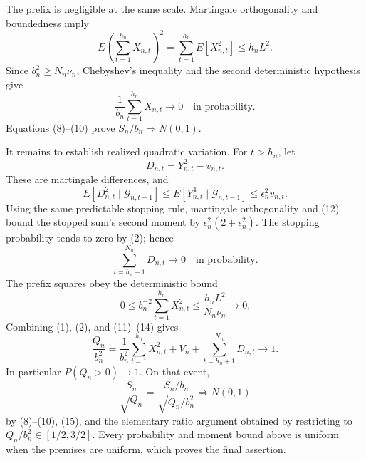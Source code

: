 The prefix is negligible at the same scale. Martingale orthogonality and boundedness imply
\[
 E\left(\sum_{t=1}^{h_n}X_{n,t}\right)^2
 =\sum_{t=1}^{h_n}E[X_{n,t}^2]\le h_nL^2.
\tag{9}
\]
Since \(b_n^2\ge N_n\nu_n\), Chebyshev's inequality and the second deterministic hypothesis give
\[
 \frac{1}{b_n}\sum_{t=1}^{h_n}X_{n,t}\longrightarrow0
 \quad\text{in probability}.
\tag{10}
\]
Equations (8)--(10) prove \(S_n/b_n\Rightarrow N(0,1)\).

It remains to establish realized quadratic variation. For \(t>h_n\), let
\[
 D_{n,t}=Y_{n,t}^2-v_{n,t}.
\tag{11}
\]
These are martingale differences, and
\[
 E[D_{n,t}^2\mid\mathcal G_{n,t-1}]
 \le E[Y_{n,t}^4\mid\mathcal G_{n,t-1}]
 \le\epsilon_n^2v_{n,t}.
\tag{12}
\]
Using the same predictable stopping rule, martingale orthogonality and (12) bound the stopped sum's second moment by \(\epsilon_n^2(2+\epsilon_n^2)\). The stopping probability tends to zero by (2); hence
\[
 \sum_{t=h_n+1}^{N_n}D_{n,t}\longrightarrow0
 \quad\text{in probability}.
\tag{13}
\]
The prefix squares obey the deterministic bound
\[
 0\le b_n^{-2}\sum_{t=1}^{h_n}X_{n,t}^2
 \le\frac{h_nL^2}{N_n\nu_n}\longrightarrow0.
\tag{14}
\]
Combining (1), (2), and (11)--(14) gives
\[
 \frac{Q_n}{b_n^2}
 =\frac1{b_n^2}\sum_{t=1}^{h_n}X_{n,t}^2+V_n+\sum_{t=h_n+1}^{N_n}D_{n,t}
 \longrightarrow1.
\tag{15}
\]
In particular \(P(Q_n>0)\to1\). On that event,
\[
 \frac{S_n}{\sqrt{Q_n}}
 =\frac{S_n/b_n}{\sqrt{Q_n/b_n^2}}\Rightarrow N(0,1)
\tag{16}
\]
by (8)--(10), (15), and the elementary ratio argument obtained by restricting to \(Q_n/b_n^2\in[1/2,3/2]\). Every probability and moment bound above is uniform when the premises are uniform, which proves the final assertion.